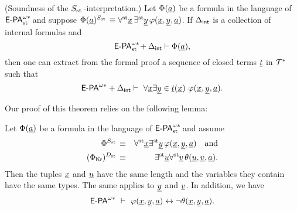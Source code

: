 \begin{thm} \label{soundnessshoenfield} {\rm (Soundness of the $\Sh$-interpretation.)} Let $\Phi(\tup a)$ be a formula in the language of $\epaststar$ and suppose $\Phi(\tup a)^\Sh\equiv\forallst \tup x \, \existsst \tup y \, \phi(\tup x, \tup y, \tup a)$. If $\Delta_{\intern}$ is a collection of internal formulas and
\[ \epaststar + \Delta_{\intern} \vdash \Phi(\tup a), \]
then one can extract from the formal proof a sequence of closed terms $\tup t$ in $\Tstar$ such that
\[
\epastar + \Delta_{\intern} \vdash\ \forall \tup x\exists \tup y \in \tup t(\tup x)\ \phi(\tup x,\tup y, \tup a).
\]
\end{thm}

Our proof of this theorem relies on the following lemma:
\begin{lemma}\label{p:ShD}
Let $\Phi(\tup a)$ be a formula in the language of $\epaststar$ and assume
\begin{eqnarray*}
\Phi^\Sh & \equiv & \forallst \tup x\existsst  \tup y \, \phi(\tup x, \tup y, \tup a) \quad \mbox{and} \\
(\Phi_\kr)^\D & \equiv & \existsst \tup u \forallst \tup v \, \theta(\tup u,\tup v, \tup a).
\end{eqnarray*}
Then the tuples $\tup x$ and $\tup u$ have the same length and the variables they contain have the same types. The same applies to $\tup y$ and $\tup v$. In addition, we have
\[
\epastar\ \vdash\ \phi(\tup x, \tup y, \tup a)\leftrightarrow \lnot \theta(\tup x, \tup y, \tup a).
\]
\end{lemma}
